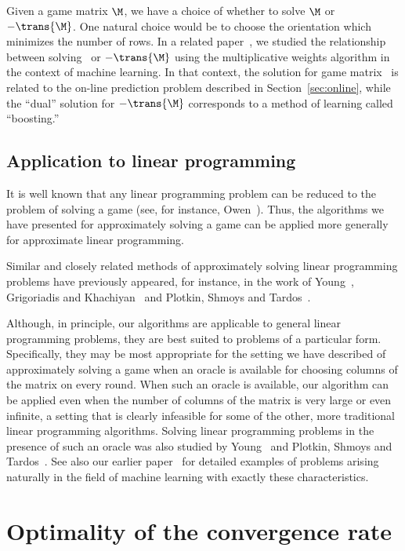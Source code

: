 Given a game matrix $\M$, we have a choice of whether to solve $\M$ or
$-\trans{\M}$. One natural choice would be to choose the orientation which
minimizes the number of rows.
In a related paper~\cite{FreundSc96b}, we studied
the relationship between solving \M\ or $-\trans{\M}$
using the multiplicative weights algorithm in the
context of machine learning. In that context, the solution for game
matrix \M\ is related to the
on-line prediction problem described in Section~\ref{sec:online}, while
the ``dual'' solution for $-\trans{\M}$ corresponds to a method of
learning called ``boosting.''

\subsection{Application to linear programming} \label{sec:linearprogramming}

It is well known that any linear programming problem can be reduced to
the problem of solving a game (see, for instance,
Owen~\cite[Theorem~III.2.6]{Owen82}).
Thus, the algorithms we have presented for approximately solving a
game can be applied more generally for approximate linear programming.

Similar and closely related methods of approximately solving linear
programming problems have previously appeared, for instance, in the
work of Young~\cite{Young95}, Grigoriadis and
Khachiyan~\cite{GrigoriadisKh91,GrigoriadisKh95} and Plotkin, Shmoys
and Tardos~\cite{PlotkinShTa95}.

Although, in principle, our algorithms are applicable to general
linear programming problems, they are best suited to problems of a
particular form.
Specifically, they may be most appropriate for the setting we have
described of approximately solving a game when an oracle is available
for choosing columns of the matrix on every round.
When such an oracle is available, our algorithm can be applied even
when the number of columns of the matrix is very large or even
infinite, a setting that is clearly infeasible for some of the other,
more traditional linear programming algorithms.
Solving linear programming problems in the presence of such an oracle
was also studied by Young~\cite{Young95} and Plotkin, Shmoys
and Tardos~\cite{PlotkinShTa95}.
See also our earlier paper~\cite{FreundSc96b} for detailed examples of
problems arising naturally in the field of machine learning with
exactly these characteristics.

\section{Optimality of the convergence rate} \label{sec:lowerbound}

